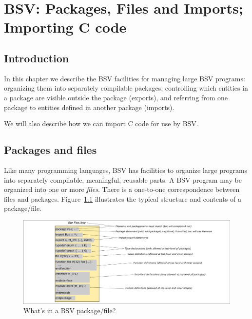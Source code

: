 

\chapter{BSV: Packages, Files and Imports; Importing C code}


\setcounter{page}{1}
\renewcommand{\thepage}{\arabic{chapter}-\arabic{page}}

\label{ch_Packages}


\section{Introduction}

In this chapter we describe the BSV facilities for managing large BSV
programs: organizing them into separately compilable packages,
controlling which entities in a package are visible outside the
package (exports), and referring from one package to entities defined
in another package (imports).

We will also describe how we can import C code for use by BSV.


\section{Packages and files}


Like many programming languages, BSV has facilities to organize large
programs into separately compilable, meaningful, reusable parts.  A
BSV program may be organized into one or more \emph{files}.  There is
a one-to-one correspondence between files and
packages. Figure~\ref{Fig_BSV_Package} illustrates the typical
structure and contents of a package/file.
\begin{figure}[htbp]
  \centerline{\includegraphics[width=6in,angle=0]{Figures/Fig_BSV_Package}}
  \caption{\label{Fig_BSV_Package}
           What's in a BSV package/file?}
\end{figure}

